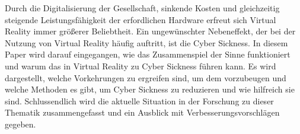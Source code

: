 Durch die Digitalisierung der Gesellschaft, sinkende Kosten und gleichzeitig steigende Leistungsf\"ahigkeit der erfordlichen Hardware erfreut sich Virtual Reality immer gr\"oßerer Beliebtheit. Ein ungew\"unschter Nebeneffekt, der bei der Nutzung von Virtual Reality h\"aufig auftritt, ist die Cyber Sickness. In diesem Paper wird darauf eingegangen, wie das Zusammenspiel der Sinne funktioniert und warum das in Virtual Reality zu Cyber Sickness f\"uhren kann. Es wird dargestellt, welche Vorkehrungen zu ergreifen sind, um dem vorzubeugen und welche Methoden es gibt, um Cyber Sickness zu reduzieren und wie hilfreich sie sind. Schlussendlich wird die aktuelle Situation in der Forschung zu dieser Thematik zusammengefasst und ein Ausblick mit Verbesserungsvorschl\"agen gegeben.